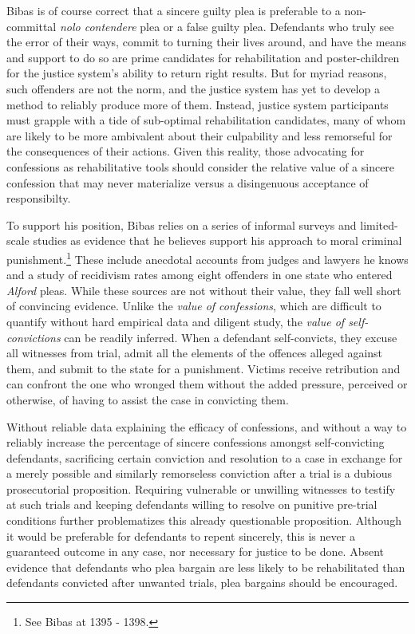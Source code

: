 Bibas is of course correct that a sincere guilty plea is preferable to a non-committal \textit{nolo contendere} plea or a false guilty plea. Defendants who truly see the error of their ways, commit to turning their lives around, and have the means and support to do so are prime candidates for rehabilitation and poster-children for the justice system's ability to return right results. But for myriad reasons, such offenders are not the norm, and the justice system has yet to develop a method to reliably produce more of them. Instead, justice system participants must grapple with a tide of sub-optimal rehabilitation candidates, many of whom are likely to be more ambivalent about their culpability and less remorseful for the consequences of their actions. Given this reality, those advocating for confessions as rehabilitative tools should consider the relative value of a sincere confession that may never materialize versus a disingenuous acceptance of responsibilty. 

To support his position, Bibas relies on a series of informal surveys and limited-scale studies as evidence that he believes support his approach to moral criminal punishment.\footnote{See Bibas at 1395 - 1398.} These include anecdotal accounts from judges and lawyers he knows and a study of recidivism rates among eight offenders in one state who entered \textit{Alford} pleas. While these sources are not without their value, they fall well short of convincing evidence. Unlike the \textit{value of confessions}, which are difficult to quantify without hard empirical data and diligent study, the \textit{value of self-convictions} can be readily inferred. When a defendant self-convicts, they excuse all witnesses from trial, admit all the elements of the offences alleged against them, and submit to the state for a punishment. Victims receive retribution and can confront the one who wronged them without the added pressure, perceived or otherwise, of having to assist the case in convicting them. 

Without reliable data explaining the efficacy of confessions, and without a way to reliably increase the percentage of sincere confessions amongst self-convicting defendants, sacrificing certain conviction and resolution to a case in exchange for a merely possible and similarly remorseless conviction after a trial is a dubious prosecutorial proposition. Requiring vulnerable or unwilling witnesses to testify at such trials and keeping defendants willing to resolve on punitive pre-trial conditions further problematizes this already questionable proposition. Although it would be preferable for defendants to repent sincerely, this is never a guaranteed outcome in any case, nor necessary for justice to be done. Absent evidence that defendants who plea bargain are less likely to be rehabilitated than defendants convicted after unwanted trials, plea bargains should be encouraged.

